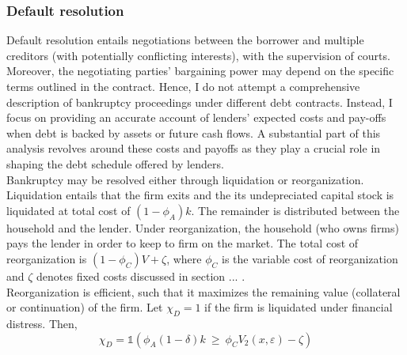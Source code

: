 \documentclass[12pt]{article}
\begin{document}
\subsubsection{Default resolution}
Default resolution entails negotiations between the borrower and multiple creditors (with potentially conflicting interests), with the supervision of courts. Moreover, the negotiating parties' bargaining power may depend on the specific terms outlined in the contract. Hence, I do not attempt a comprehensive description of bankruptcy proceedings under different debt contracts. Instead, I focus on providing an accurate account of lenders' expected costs and pay-offs when debt is backed by assets or future cash flows. A substantial part of this analysis revolves around these costs and payoffs as they play a crucial role in shaping the debt schedule offered by lenders. \vspace{3mm} \\
Bankruptcy may be resolved either through liquidation or reorganization. Liquidation entails that the firm exits and the its undepreciated capital stock is liquidated at total cost of $(1-\phi_A)k$. The remainder is distributed between the household and the lender. Under reorganization, the household (who owns firms) pays the lender in order to keep to firm on the market. The total cost of reorganization is $ (1-\phi_C) V + \zeta$, where $\phi_C$ is the variable cost of reorganization and $\zeta$ denotes fixed costs discussed in section ... . \vspace{3mm} \\
Reorganization is efficient, such that it maximizes the remaining value (collateral or continuation) of the firm. Let $\chi_D = 1$ if the firm is liquidated under financial distress. Then,
\begin{equation} \label{eq:liquidation decision}
    \chi_D =  \mathds{1}(\phi_A (1-\delta) k  \  \geq \ \phi_C V_2(x,\varepsilon)- \zeta)  
\end{equation}
\end{document}
